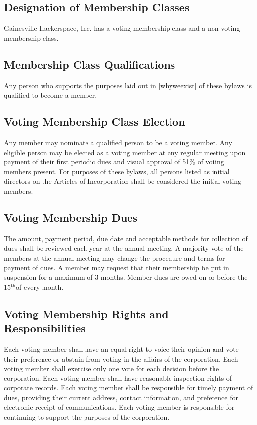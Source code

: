\documentclass[10pt,letterpaper,titlepage]{article}
\newcommand\corpname{Gainesville Hackerspace, Inc.}
\newcommand{\superscript}[1]{\ensuremath{^{\textrm{#1}}}}
\renewcommand{\th}[0]{\superscript{th}}
\begin{document}
\subsection{Designation of Membership Classes}
 
\corpname{} has a voting membership class and a non-voting membership class. 

\subsection{Membership Class Qualifications}
 
Any person who supports the purposes laid out in \ref{whyweexist} of these
bylaws is qualified to become a member.

\subsection{Voting Membership Class Election}
 
Any member may nominate a qualified person to be a voting member.  Any eligible
person may be elected as a voting member at any regular meeting upon payment of
their first periodic dues and visual approval of 51\% of voting members
present.
For purposes of these bylaws, all persons listed as initial directors on the
Articles of Incorporation shall be considered the initial voting members.

\subsection{Voting Membership Dues}
\label{votmemdue}
 
The amount, payment period, due date and acceptable methods for collection of
dues shall be reviewed each year at the annual meeting.
A majority vote of the members at the annual meeting may change the procedure
and terms for payment of dues.
A member may request that their membership be put in suspension for a maximum
of 3 months.
Member dues are owed on or before the 15\th of every month.

\subsection{Voting Membership Rights and Responsibilities}
 
Each voting member shall have an equal right to voice their opinion and vote
their preference or abstain from voting in the affairs of the corporation.
Each voting member shall exercise only one vote for each decision before the
corporation.
Each voting member shall have reasonable inspection rights of corporate
records.
Each voting member shall be responsible for timely payment of dues, providing
their current address, contact information, and preference for electronic
receipt of communications.
Each voting member is responsible for continuing to support the purposes of the
corporation.
\end{document}

